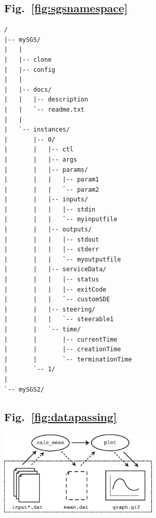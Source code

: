 \documentclass[a4paper]{article}
\begin{document}
\subsection*{Fig.~\ref{fig:sgsnamespace}}
\begin{verbatim}
/
|-- mySGS/
|   |
|   |-- clone
|   |-- config
|   |
|   |-- docs/
|   |   |-- description
|   |   `-- readme.txt
|   |
|   `-- instances/
|       |-- 0/
|       |   |-- ctl
|       |   |-- args
|       |   |-- params/
|       |   |   |-- param1
|       |   |   `-- param2
|       |   |-- inputs/
|       |   |   |-- stdin
|       |   |   `-- myinputfile
|       |   |-- outputs/
|       |   |   |-- stdout
|       |   |   |-- stderr
|       |   |   `-- myoutputfile
|       |   |-- serviceData/
|       |   |   |-- status
|       |   |   |-- exitCode
|       |   |   `-- customSDE
|       |   |-- steering/
|       |   |   `-- steerable1
|       |   `-- time/
|       |       |-- currentTime
|       |       |-- creationTime
|       |       `-- terminationTime
|       `-- 1/
|
`-- mySGS2/
\end{verbatim}

\newpage

\subsection*{Fig.~\ref{fig:datapassing}}
\includegraphics[height=4.2cm]{datapassing.eps}
\end{document}
